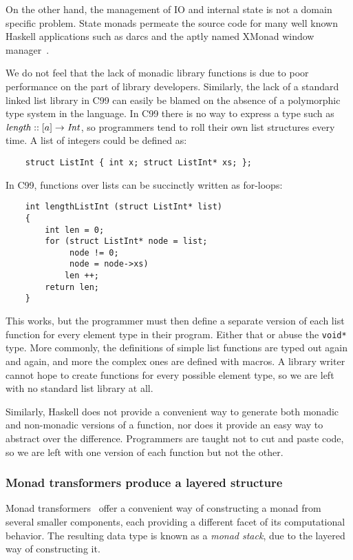 On the other hand, the management of IO and internal state is not a domain specific problem. State monads permeate the source code for many well known Haskell applications such as darcs and the aptly named XMonad window manager~\cite{stewart:xmonad}. 

We do not feel that the lack of monadic library functions is due to poor performance on the part of library developers. Similarly, the lack of a standard linked list library in C99 can easily be blamed on the absence of a polymorphic type system in the language. In C99 there is no way to express a type such as $\operatorname{\mathit{length}} :: [a] \to \operatorname{\mathit{Int}}$, so programmers tend to roll their own list structures every time. A list of integers could be defined as:

\begin{lstlisting}
    struct ListInt { int x; struct ListInt* xs; };
\end{lstlisting} 

In C99, functions over lists can be succinctly written as for-loops:

\begin{lstlisting}
    int lengthListInt (struct ListInt* list)
    {
        int len	= 0;
        for (struct ListInt* node = list; 
             node != 0; 
             node = node->xs)
            len ++;
        return len;
    }
\end{lstlisting}

This works, but the programmer must then define a separate version of each list function for every element type in their program. Either that or abuse the \texttt{void*} type. More commonly, the definitions of simple list functions are typed out again and again, and more the complex ones are defined with macros. A library writer cannot hope to create functions for every possible element type, so we are left with no standard list library at all.

Similarly, Haskell does not provide a convenient way to generate both monadic and non-monadic versions of a function, nor does it provide an easy way to abstract over the difference. Programmers are taught not to cut and paste code, so we are left with one version of each function but not the other.

\subsubsection{Monad transformers produce a layered structure }

Monad transformers~\cite{liang:monad-transformers} offer a convenient way of constructing a monad from several smaller components, each providing a different facet of its computational behavior. The resulting data type is known as a \emph{monad stack}, due to the layered way of constructing it. 

